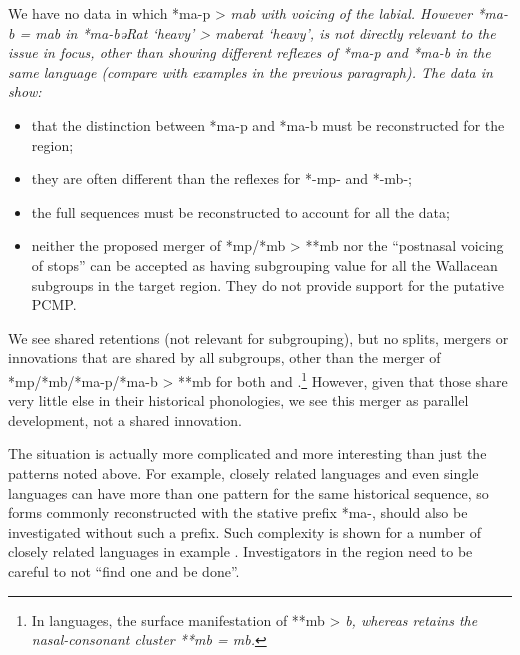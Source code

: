 We have no data in which *ma-p > \it{mab} with voicing of the labial.
However *ma-b = \it{mab} in *ma-bəRat ‘heavy’ >  \it{maberat}
‘heavy’, is not directly relevant to the issue in focus,
other than showing different reflexes of *ma-p
and *ma-b in the same language (compare with examples in the previous paragraph).
The data in  show:

\begin{itemize}
	\item[a.]	that the distinction between *ma-p
						and *ma-b must be reconstructed for the region;
	\item[b.]	they are often different than the reflexes for *-mp-
						and *-mb-;
	\item[c.]	the full sequences must be reconstructed to
						account for all the data;
	\item[d.]	neither the proposed merger of *mp/*mb > **mb nor the “postnasal
						voicing of stops” can be accepted as having subgrouping value
						for all the Wallacean subgroups in the target region.
						They do not provide support for the putative PCMP.
\end{itemize}

We see shared retentions (not relevant for subgrouping),
but no splits, mergers or innovations that are shared by all
subgroups, other than the merger of
*mp/*mb/*ma-p/*ma-b > **mb for both  and .\footnote{
		In  languages, the surface manifestation of **mb > \it{b},
		whereas  retains the nasal-consonant cluster **mb = \it{mb}.}
However, given that those share very little
else in their historical phonologies,
we see this merger as parallel development,
not a shared innovation.

The situation is actually more complicated
and more interesting than just the patterns noted above.
For example, closely related languages
and even single languages can have more than one pattern for
the same historical sequence,
so forms commonly reconstructed with the stative prefix *ma-,
should also be investigated without such a prefix.
Such complexity is shown for a number of closely related 
languages in example .
Investigators in the region need to be careful to not “find one and be done”.

